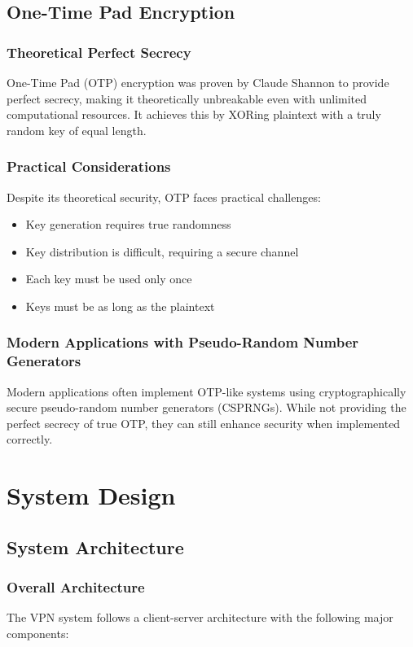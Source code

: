 \documentclass[12pt,a4paper]{report}
\begin{document}
\section{One-Time Pad Encryption}
\subsection{Theoretical Perfect Secrecy}
One-Time Pad (OTP) encryption was proven by Claude Shannon to provide perfect secrecy, making it theoretically unbreakable even with unlimited computational resources. It achieves this by XORing plaintext with a truly random key of equal length.

\subsection{Practical Considerations}
Despite its theoretical security, OTP faces practical challenges:
\begin{itemize}
    \item Key generation requires true randomness
    \item Key distribution is difficult, requiring a secure channel
    \item Each key must be used only once
    \item Keys must be as long as the plaintext
\end{itemize}

\subsection{Modern Applications with Pseudo-Random Number Generators}
Modern applications often implement OTP-like systems using cryptographically secure pseudo-random number generators (CSPRNGs). While not providing the perfect secrecy of true OTP, they can still enhance security when implemented correctly.

\chapter{System Design}
\section{System Architecture}
\subsection{Overall Architecture}
The VPN system follows a client-server architecture with the following major components:
\end{document}
